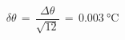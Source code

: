 \begin{equation*}
	\delta \theta \,=\, \frac{\Delta \theta}{\sqrt{12}} \,=\, \SI{0.003}{\celsius}
\end{equation*}
%

%

%

%

%


